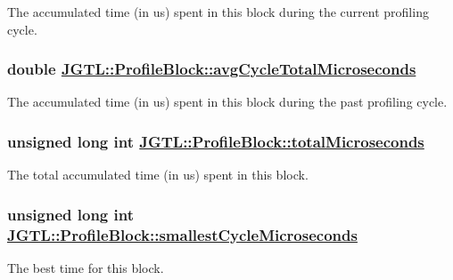 The accumulated time (in us) spent in this block during the current profiling cycle. \hypertarget{struct_j_g_t_l_1_1_profile_block_d995e3d70a098db440f9002aef727d40}{
\subsubsection[avgCycleTotalMicroseconds]{\setlength{\rightskip}{0pt plus 5cm}double \hyperlink{struct_j_g_t_l_1_1_profile_block_d995e3d70a098db440f9002aef727d40}{JGTL::Profile\-Block::avg\-Cycle\-Total\-Microseconds}}}
\label{struct_j_g_t_l_1_1_profile_block_d995e3d70a098db440f9002aef727d40}


The accumulated time (in us) spent in this block during the past profiling cycle. \hypertarget{struct_j_g_t_l_1_1_profile_block_457aeecf869359baed544fa467d46b42}{
\subsubsection[totalMicroseconds]{\setlength{\rightskip}{0pt plus 5cm}unsigned long int \hyperlink{struct_j_g_t_l_1_1_profile_block_457aeecf869359baed544fa467d46b42}{JGTL::Profile\-Block::total\-Microseconds}}}
\label{struct_j_g_t_l_1_1_profile_block_457aeecf869359baed544fa467d46b42}


The total accumulated time (in us) spent in this block. 

\hypertarget{struct_j_g_t_l_1_1_profile_block_8edab8046fbb65df2c8bef07c638829b}{
\subsubsection[smallestCycleMicroseconds]{\setlength{\rightskip}{0pt plus 5cm}unsigned long int \hyperlink{struct_j_g_t_l_1_1_profile_block_8edab8046fbb65df2c8bef07c638829b}{JGTL::Profile\-Block::smallest\-Cycle\-Microseconds}}}
\label{struct_j_g_t_l_1_1_profile_block_8edab8046fbb65df2c8bef07c638829b}


The best time for this block. 

